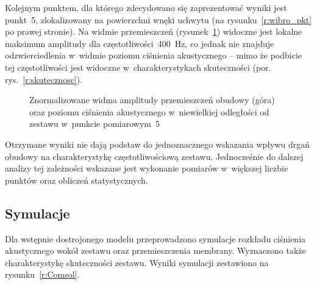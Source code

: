 \documentclass[12pt]{oska}
\begin{document}
		Kolejnym punktem, dla którego zdecydowano się zaprezentować wyniki jest punkt~\num{5}, zlokalizowany na powierzchni wnęki uchwytu (na rysunku~\ref{r:wibro_pkt} po prawej stronie). Na widmie przemieszczeń (rysunek~\ref{r:wibrometr_5}) widoczne jest lokalne maksimum amplitudy dla częstotliwości~\SI{400}{\hertz}, co jednak nie znajduje odzwierciedlenia w~widmie poziomu ciśnienia akustycznego -- mimo że podbicie tej częstotliwości jest widoczne w~charakterystykach skuteczności (por. rys.~\ref{r:skutecznosc}).%
		
		\begin{figure}[!ht]
			\centering
			\caption{Znormalizowane widma amplitudy przemieszczeń obudowy (góra) oraz poziomu ciśnienia akustycznego w~niewielkiej odległości od zestawu w~punkcie pomiarowym~\num{5}}
			\label{r:wibrometr_5}
		\end{figure}
		
		Otrzymane wyniki nie dają podstaw do jednoznacznego wskazania wpływu drgań obudowy na charakterystykę częstotliwościową zestawu. Jednocześnie do dalszej analizy tej zależności wskazane jest wykonanie pomiarów w~większej liczbie punktów oraz obliczeń statystycznych.
		
	\subsection{Symulacje}
		
		Dla wstępnie dostrojonego modelu przeprowadzono symulacje rozkładu ciśnienia akustycznego wokół zestawu oraz przemieszczenia membrany. Wyznaczono także charakterystykę skuteczności zestawu. Wyniki symulacji zestawiono na rysunku~\ref{r:Comsol}.
		
\end{document}
